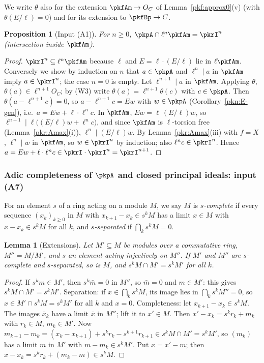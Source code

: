 \documentclass[10pt]{amsart}
\newtheorem{proposition}[theorem]{Proposition}
\newtheorem{lemma}[theorem]{Lemma}
\theoremstyle{definition}
\theoremstyle{remark}
\begin{document}
We write $\theta$ also for the extension $\pkfAm\to O_C$ of Lemma~\ref{pkf:approx0}(v) (with
$\theta(E/\ell)=0$) and for its extension to $\pkfBp\to C$.

\begin{proposition}[Input (A1)]\label{pkr:I1}
For $n\ge0$, $\pkpA\cap\ell^n\pkfAm=\pkrI^n$ (intersection inside $\pkfAm$).
\end{proposition}

\begin{proof}
$\pkrI^n\subseteq\ell^n\pkfAm$ because $\ell$ and $E=\ell\cdot(E/\ell)$ lie in $\ell\pkfAm$. Conversely
we show by induction on $n$ that $a\in\pkpA$ and $\ell^n\mid a$ in $\pkfAm$ imply $a\in\pkrI^n$; the case
$n=0$ is empty. Let $\ell^{n+1}\mid a$ in $\pkfAm$. Applying $\theta$, $\theta(a)\in\ell^{n+1}O_C$; by
(W3) write $\theta(a)=\ell^{n+1}\theta(c)$ with $c\in\pkpA$. Then $\theta(a-\ell^{n+1}c)=0$, so
$a-\ell^{n+1}c=Ew$ with $w\in\pkpA$ (Corollary~\ref{pkn:E-gen}), i.e.\ $a=Ew+\ell\cdot\ell^nc$. In $\pkfAm$,
$Ew=\ell\,(E/\ell)w$, so $\ell^{n+1}\mid\ell\bigl((E/\ell)w+\ell^nc\bigr)$, and since $\pkfAm$ is $\ell$-torsion
free (Lemma~\ref{pkr:Amax}(i)), $\ell^n\mid(E/\ell)w$. By Lemma~\ref{pkr:Amax}(iii) with $f=X$,
$\ell^n\mid w$ in $\pkfAm$, so $w\in\pkrI^n$ by induction; also $\ell^nc\in\pkrI^n$. Hence
$a=Ew+\ell\cdot\ell^nc\in\pkrI\cdot\pkrI^n=\pkrI^{n+1}$.
\end{proof}

\subsubsection{Adic completeness of $\pkpA$ and closed principal ideals: input (A7)}\label{pkr:ss-complete}

For an element $s$ of a ring acting on a module $M$, we say $M$ is \emph{$s$-complete} if every sequence
$(x_k)_{k\ge0}$ in $M$ with $x_{k+1}-x_k\in s^kM$ has a limit $x\in M$ with $x-x_k\in s^kM$ for all $k$,
and \emph{$s$-separated} if $\bigcap_ks^kM=0$.

\begin{lemma}[Extensions]\label{pkr:ext}
Let $M'\subseteq M$ be modules over a commutative ring, $M''=M/M'$, and $s$ an element acting
injectively on $M''$. If $M'$ and $M''$ are $s$-complete and $s$-separated, so is $M$, and
$s^kM\cap M'=s^kM'$ for all $k$.
\end{lemma}

\begin{proof}
If $s^km\in M'$, then $s^k\bar m=0$ in $M''$, so $\bar m=0$ and $m\in M'$: this gives $s^kM\cap M'=
s^kM'$. Separation: if $x\in\bigcap_ks^kM$, its image lies in $\bigcap_ks^kM''=0$, so $x\in M'\cap s^kM=
s^kM'$ for all $k$ and $x=0$. Completeness: let $x_{k+1}-x_k\in s^kM$. The images $\bar x_k$ have a
limit $\bar x$ in $M''$; lift it to $x'\in M$. Then $x'-x_k=s^kr_k+m_k$ with $r_k\in M$, $m_k\in M'$.
Now $m_{k+1}-m_k=(x_k-x_{k+1})+s^kr_k-s^{k+1}r_{k+1}\in s^kM\cap M'=s^kM'$, so $(m_k)$ has a limit $m$ in
$M'$ with $m-m_k\in s^kM'$. Put $x=x'-m$; then $x-x_k=s^kr_k+(m_k-m)\in s^kM$.
\end{proof}
\end{document}

